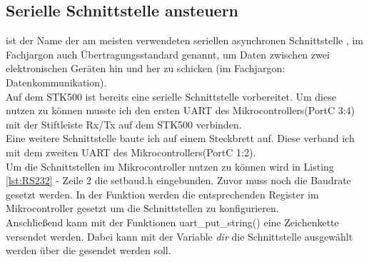\lstset{language=C, basicstyle=\footnotesize, showstringspaces=false, tabsize=8}


\subsection{Serielle Schnittstelle ansteuern}
\label{sec:RS232}	
 ist der Name der am meisten verwendeten seriellen asynchronen Schnittstelle , im Fachjargon auch Übertragungsstandard genannt, um Daten zwischen zwei elektronischen Geräten hin und her zu schicken (im Fachjargon: Datenkommunikation).\cite{uC:rs232}\\
Auf dem STK500 ist bereits eine serielle Schnittstelle vorbereitet. Um diese nutzen zu können musste ich den ersten UART des Mikrocontrollers(PortC 3:4) mit der Stiftleiste Rx/Tx auf dem STK500 verbinden.\\
Eine weitere Schnittstelle baute ich auf einem Steckbrett auf. Diese verband ich mit dem zweiten UART des Mikrocontrollers(PortC 1:2).\\
Um die Schnittstellen im Mikrocontroller nutzen zu können wird in Listing \ref{lst:RS232} - Zeile 2 die setbaud.h eingebunden. Zuvor muss noch die Baudrate gesetzt werden.
In der Funktion  werden die entsprechenden Register im Mikrocontroller gesetzt um die Schnittstellen zu konfigurieren.\\
Anschließend kann mit der Funktionen uart\_put\_string() eine Zeichenkette versendet werden. Dabei kann mit der Variable \emph{dir} die Schnittstelle ausgewählt werden über die gesendet werden soll.
\lstset{language=C, basicstyle=\footnotesize, showstringspaces=false, tabsize=8}


